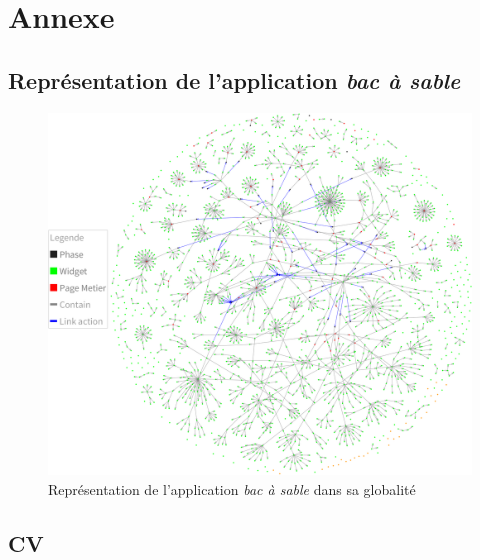 \newpage
\appendix

\hypertarget{annexe}{%
\section{Annexe}\label{annexe}}

\hypertarget{appendix:representationGlobal}{%
\subsection{\texorpdfstring{Représentation de l'application \emph{bac à
sable}}{Représentation de l'application bac à sable}}\label{appendix:representationGlobal}}

\hypertarget{firework}{%
\begin{figure}
\centering
\includegraphics{figures/firework.png}
\caption{Représentation de l'application \emph{bac à sable} dans sa
globalité}\label{firework}
\end{figure}
}

\newpage

\hypertarget{cv}{%
\subsection{CV}\label{cv}}


